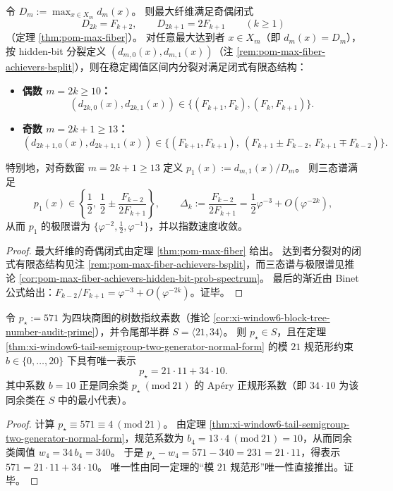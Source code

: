 \begin{corollary}\label{cor:xi-max-fiber-parity-hiddenbit-finite-spectrum}
令 \(D_m:=\max_{x\in X_m}d_m(x)\)。
则最大纤维满足奇偶闭式
\[
D_{2k}=F_{k+2},\qquad D_{2k+1}=2F_{k+1}
\qquad(k\ge 1)
\]
（定理 \ref{thm:pom-max-fiber}）。
对任意最大达到者 \(x\in X_m\)（即 \(d_m(x)=D_m\)），按 hidden-bit 分裂定义 \((d_{m,0}(x),d_{m,1}(x))\)（注 \ref{rem:pom-max-fiber-achievers-bsplit}），则在稳定阈值区间内分裂对满足闭式有限态结构：
\begin{itemize}
  \item \textbf{偶数 \(m=2k\ge 10\)：}
  \[
  (d_{2k,0}(x),d_{2k,1}(x))\in\{(F_{k+1},F_k),(F_k,F_{k+1})\}.
  \]
  \item \textbf{奇数 \(m=2k+1\ge 13\)：}
  \[
  (d_{2k+1,0}(x),d_{2k+1,1}(x))\in\{(F_{k+1},F_{k+1}),\ (F_{k+1}\pm F_{k-2},\,F_{k+1}\mp F_{k-2})\}.
  \]
\end{itemize}
特别地，对奇数窗 \(m=2k+1\ge 13\) 定义
\(
p_1(x):=d_{m,1}(x)/D_m
\)。
则三态谱满足
\[
p_1(x)\in\left\{\frac12,\ \frac12\pm\frac{F_{k-2}}{2F_{k+1}}\right\},
\qquad
\Delta_k:=\frac{F_{k-2}}{2F_{k+1}}=\frac12\varphi^{-3}+O(\varphi^{-2k}),
\]
从而 \(p_1\) 的极限谱为 \(\{\varphi^{-2},\tfrac12,\varphi^{-1}\}\)，并以指数速度收敛。
\end{corollary}

\begin{proof}
最大纤维的奇偶闭式由定理 \ref{thm:pom-max-fiber} 给出。
达到者分裂对的闭式有限态结构见注 \ref{rem:pom-max-fiber-achievers-bsplit}，而三态谱与极限谱见推论 \ref{cor:pom-max-fiber-achievers-hidden-bit-prob-spectrum}。
最后的渐近由 Binet 公式给出：\(F_{k-2}/F_{k+1}=\varphi^{-3}+O(\varphi^{-2k})\)。证毕。
\end{proof}

\begin{corollary}[审计素数 \texorpdfstring{$p_\star=571$}{p*=571} 的尾部半群 Ap\'ery 正规形与唯一性]\label{cor:xi-audit-prime-571-apery-normal-form}
令 \(p_\star:=571\) 为四块商图的树数指纹素数（推论 \ref{cor:xi-window6-block-tree-number-audit-prime}），并令尾部半群 \(S=\langle 21,34\rangle\)。
则 \(p_\star\in S\)，且在定理 \ref{thm:xi-window6-tail-semigroup-two-generator-normal-form} 的模 \(21\) 规范形约束 \(b\in\{0,\dots,20\}\) 下具有唯一表示
\[
p_\star=21\cdot 11+34\cdot 10.
\]
其中系数 \(b=10\) 正是同余类 \(p_\star\ (\mathrm{mod}\ 21)\) 的 Ap\'ery 正规形系数（即 \(34\cdot 10\) 为该同余类在 \(S\) 中的最小代表）。
\end{corollary}

\begin{proof}
计算 \(p_\star\equiv 571\equiv 4\ (\mathrm{mod}\ 21)\)。
由定理 \ref{thm:xi-window6-tail-semigroup-two-generator-normal-form}，规范系数为
\(
b_{4}=13\cdot 4\ (\mathrm{mod}\ 21)=10
\)，从而同余类阈值 \(w_4=34\,b_4=340\)。
于是
\(
p_\star-w_4=571-340=231=21\cdot 11
\)，得表示 \(571=21\cdot 11+34\cdot 10\)。
唯一性由同一定理的“模 \(21\) 规范形”唯一性直接推出。证毕。
\end{proof}
